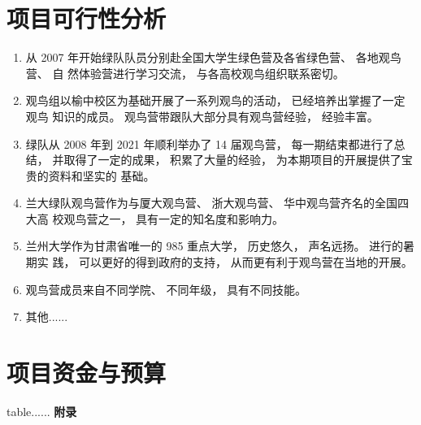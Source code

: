 \documentclass[UTF8,a4paper，12pt]{ctexart}
\begin{document}
\section{项目可行性分析}
\begin{enumerate}[itemindent=1em]
\item 从 2007 年开始绿队队员分别赴全国大学生绿色营及各省绿色营、 各地观鸟营、 自
然体验营进行学习交流， 与各高校观鸟组织联系密切。
\item 观鸟组以榆中校区为基础开展了一系列观鸟的活动， 已经培养出掌握了一定观鸟
知识的成员。 观鸟营带跟队大部分具有观鸟营经验， 经验丰富。
\item 绿队从 2008 年到 2021 年顺利举办了 14 届观鸟营， 每一期结束都进行了总结，
并取得了一定的成果， 积累了大量的经验， 为本期项目的开展提供了宝贵的资料和坚实的
基础。
\item 兰大绿队观鸟营作为与厦大观鸟营、 浙大观鸟营、 华中观鸟营齐名的全国四大高
校观鸟营之一， 具有一定的知名度和影响力。
\item 兰州大学作为甘肃省唯一的 985 重点大学， 历史悠久， 声名远扬。 进行的暑期实
践， 可以更好的得到政府的支持， 从而更有利于观鸟营在当地的开展。
\item 观鸟营成员来自不同学院、 不同年级， 具有不同技能。
\item 其他......


\end{enumerate}
\section{项目资金与预算}
table......
\newpage
\noindent\textbf{\Large{附录}}
\appendix
{}
\end{document}
